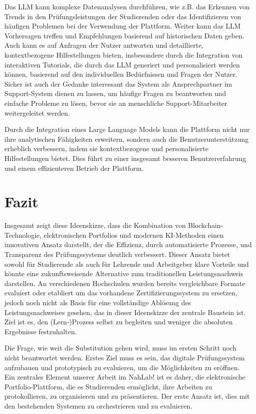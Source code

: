 \documentclass[conference]{IEEEtran}
\begin{document}
Das LLM kann komplexe Datenanalysen durchführen, wie z.B. das Erkennen von Trends in den Prüfungsleistungen der Studierenden oder das Identifizieren von häufigen Problemen bei der Verwendung der Plattform. Weiter kann das LLM  Vorhersagen treffen und Empfehlungen basierend auf historischen Daten geben.
Auch kann es auf Anfragen der Nutzer antworten und detaillierte, kontextbezogene Hilfestellungen bieten, insbesondere durch die  Integration von interaktiven Tutorials, die durch das LLM generiert und personalisiert werden können, basierend auf den individuellen Bedürfnissen und Fragen der Nutzer. \\
Sicher ist auch der Gedanke interessant das System als Ansprechpartner im Support-System dienen zu lassen, um häufige Fragen zu beantworten und einfache Probleme zu lösen, bevor sie an menschliche Support-Mitarbeiter weitergeleitet werden.

Durch die Integration eines Large Language Models kann die Plattform nicht nur ihre analytischen Fähigkeiten erweitern, sondern auch die Benutzerunterstützung erheblich verbessern, indem sie kontextbezogene und personalisierte Hilfestellungen bietet. Dies führt zu einer insgesamt besseren Benutzererfahrung und einem effizienteren Betrieb der Plattform.

\section{Fazit}
Insgesamt zeigt diese Ideenskizze, dass die Kombination von Blockchain-Technologie, elektronischen Portfolios und modernen KI-Methoden einen innovativen Ansatz darstellt, der die Effizienz, durch automatisierte Prozesse, und Transparenz des Prüfungssystems deutlich verbessert. Dieser Ansatz bietet sowohl für Studierende als auch für Lehrende und Arbeitgeber klare Vorteile und könnte eine zukunftsweisende Alternative zum traditionellen Leistungsnachweis  darstellen. An verschiedenen Hochschulen wurden bereits vergleichbare Formate evaluiert oder etabliert um das vorhandene Zertifizierungssystem zu ersetzen, jedoch noch nicht als Basis für eine vollständige Ablösung des Leistungsnachweises gesehen, das in dieser Ideenskizze der zentrale Baustein ist. Ziel ist es, den (Lern-)Prozess selbst zu begleiten und weniger die absoluten Ergebnisse festzuhalten.

Die Frage, wie weit die Substitution gehen wird, muss im ersten Schritt noch nicht beantwortet werden. Erstes Ziel muss es sein, das digitale Prüfungssystem aufzubauen und prototypisch zu evaluieren, um die Möglichkeiten zu eröffnen. Ein zentrales Element unserer Arbeit im NahLab! ist es daher, die elektronische Portfolio-Plattform, die es Studierenden ermöglicht, ihre Arbeiten zu protokollieren, zu organisieren und zu präsentieren. Der erste Ansatz ist, dies mit den bestehenden Systemen zu orchestrieren und zu evaluieren. 
\end{document}
